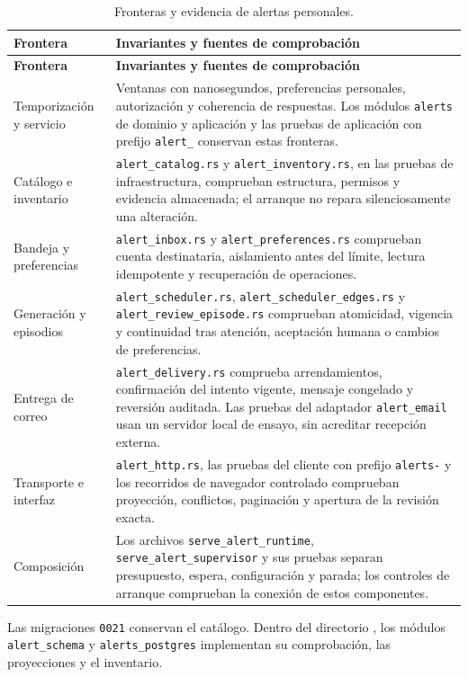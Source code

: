 \begin{longtable}{@{}L{0.23\textwidth}L{0.71\textwidth}@{}}
  \caption{Fronteras y evidencia de alertas personales.}\label{tab:matriz-alertas}\\
  \toprule
  \textbf{Frontera} & \textbf{Invariantes y fuentes de comprobación} \\
  \midrule
  \endfirsthead
  \toprule
  \textbf{Frontera} & \textbf{Invariantes y fuentes de comprobación} \\
  \midrule
  \endhead
  Temporización y servicio & Ventanas con nanosegundos, preferencias personales, autorización y coherencia de respuestas. Los módulos \texttt{alerts} de dominio y aplicación y las pruebas de aplicación con prefijo \texttt{alert\_} conservan estas fronteras. \\
  Catálogo e inventario & \texttt{alert\_catalog.rs} y \texttt{alert\_inventory.rs}, en las pruebas de infraestructura, comprueban estructura, permisos y evidencia almacenada; el arranque no repara silenciosamente una alteración. \\
  Bandeja y preferencias & \texttt{alert\_inbox.rs} y \texttt{alert\_preferences.rs} comprueban cuenta destinataria, aislamiento antes del límite, lectura idempotente y recuperación de operaciones. \\
  Generación y episodios & \texttt{alert\_scheduler.rs}, \texttt{alert\_scheduler\_edges.rs} y \texttt{alert\_review\_episode.rs} comprueban atomicidad, vigencia y continuidad tras atención, aceptación humana o cambios de preferencias. \\
  Entrega de correo & \texttt{alert\_delivery.rs} comprueba arrendamientos, confirmación del intento vigente, mensaje congelado y reversión auditada. Las pruebas del adaptador \texttt{alert\_email} usan un servidor local de ensayo, sin acreditar recepción externa. \\
  Transporte e interfaz & \texttt{alert\_http.rs}, las pruebas del cliente con prefijo \texttt{alerts-} y los recorridos de navegador controlado comprueban proyección, conflictos, paginación y apertura de la revisión exacta. \\
  Composición & Los archivos \texttt{serve\_alert\_runtime}, \texttt{serve\_alert\_supervisor} y sus pruebas separan presupuesto, espera, configuración y parada; los controles de arranque comprueban la conexión de estos componentes. \\
  \bottomrule
\end{longtable}
\endgroup

Las migraciones \texttt{0021} conservan el catálogo. Dentro del directorio , los módulos \texttt{alert\_schema} y \texttt{alerts\_postgres} implementan su comprobación, las proyecciones y el inventario.

